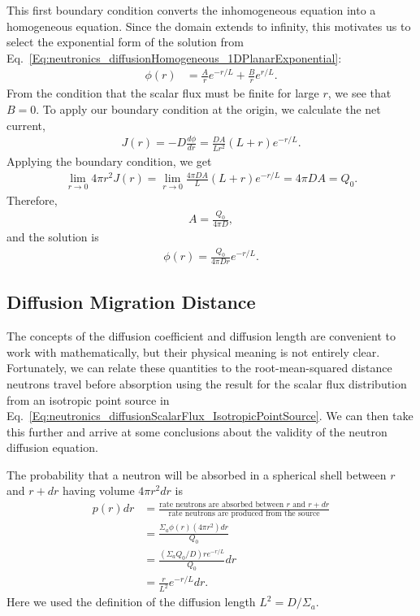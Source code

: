 This first boundary condition converts the inhomogeneous equation into a homogeneous equation. Since the domain extends to infinity, this motivates us to select the exponential form of the solution from Eq.~\eqref{Eq:neutronics_diffusionHomogeneous_1DPlanarExponential}:
\begin{align}
  \phi(r) &= \frac{A}{r} e^{-r/L} + \frac{B}{r} e^{r/L}.
\end{align}
From the condition that the scalar flux must be finite for large $r$, we see that $B = 0$. To apply our boundary condition at the origin, we calculate the net current,
\begin{align}
  J(r) = -D\frac{d\phi}{dr} = \frac{DA}{L r^2} ( L + r ) e^{-r/L} .
\end{align}
Applying the boundary condition, we get
\begin{align}
  \lim_{r \rightarrow 0} 4 \pi r^2  J(r) =  \lim_{r \rightarrow 0} \frac{4\pi DA}{L} ( L + r ) e^{-r/L} = 4 \pi D A = Q_0 .
\end{align}
Therefore,
\begin{align}
  A = \frac{ Q_0 }{ 4\pi D },
\end{align}
and the solution is
\begin{align} \label{Eq:neutronics_diffusionScalarFlux_IsotropicPointSource}
  \phi(r) = \frac{ Q_0 }{ 4 \pi D r } e^{-r/L} .
\end{align}

\subsection{Diffusion Migration Distance} \label{Sec:neutronics_DiffusionMigrationDistance}

The concepts of the diffusion coefficient and diffusion length are convenient to work with mathematically, but their physical meaning is not entirely clear. Fortunately, we can relate these quantities to the root-mean-squared distance neutrons travel before absorption using the result for the scalar flux distribution from an isotropic point source in Eq.~\eqref{Eq:neutronics_diffusionScalarFlux_IsotropicPointSource}. We can then take this further and arrive at some conclusions about the validity of the neutron diffusion equation.

The probability that a neutron will be absorbed in a spherical shell between $r$ and $r + dr$ having volume $4\pi r^2 dr$ is
\begin{align}
  p(r) dr 
  &= \frac{\text{rate neutrons are absorbed between $r$ and $r + dr$}}{\text{rate neutrons are produced from the source}} \nonumber \\
  &= \frac{ \Sigma_a \phi(r) ( 4\pi r^2 ) dr }{ Q_0 } \nonumber \\
  &= \frac{ ( \Sigma_a Q_0 /D ) r e^{-r/L} }{ Q_0 } dr \nonumber \\
  &= \frac{r}{L^2} e^{-r/L} dr .
\end{align}
Here we used the definition of the diffusion length $L^2 = D/\Sigma_a$.

